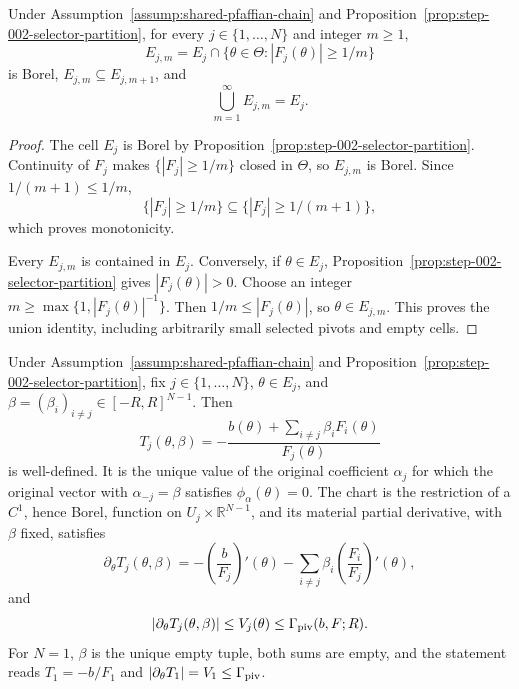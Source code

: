 \begin{lemma}
\label{lem:step-002-chart-exhaustion}
Under Assumption~\ref{assump:shared-pfaffian-chain} and
Proposition~\ref{prop:step-002-selector-partition}, for every
$j\in\{1,\ldots,N\}$ and integer $m\geq1$,
\[
E_{j,m}=E_j\cap\{\theta\in\Theta:|F_j(\theta)|\geq1/m\}
\]
is Borel, $E_{j,m}\subseteq E_{j,m+1}$, and
\[
\bigcup_{m=1}^{\infty}E_{j,m}=E_j.
\]
\end{lemma}

\begin{proof}
The cell $E_j$ is Borel by
Proposition~\ref{prop:step-002-selector-partition}.  Continuity of $F_j$
makes $\{|F_j|\geq1/m\}$ closed in $\Theta$, so $E_{j,m}$ is Borel.  Since
$1/(m+1)\leq1/m$,
\[
\{|F_j|\geq1/m\}\subseteq\{|F_j|\geq1/(m+1)\},
\]
which proves monotonicity.

Every $E_{j,m}$ is contained in $E_j$.  Conversely, if $\theta\in E_j$,
Proposition~\ref{prop:step-002-selector-partition} gives
$|F_j(\theta)|>0$.  Choose an integer
$m\geq\max\{1,|F_j(\theta)|^{-1}\}$.  Then
$1/m\leq|F_j(\theta)|$, so $\theta\in E_{j,m}$.  This proves the union
identity, including arbitrarily small selected pivots and empty cells.
\end{proof}

\begin{proposition}
\label{prop:step-002-exact-chart}
Under Assumption~\ref{assump:shared-pfaffian-chain} and
Proposition~\ref{prop:step-002-selector-partition}, fix
$j\in\{1,\ldots,N\}$, $\theta\in E_j$, and
$\beta=(\beta_i)_{i\neq j}\in[-R,R]^{N-1}$.  Then
\[
T_j(\theta,\beta)
=-\frac{b(\theta)+\sum_{i\neq j}\beta_iF_i(\theta)}{F_j(\theta)}
\]
is well-defined.  It is the unique value of the original coefficient
$\alpha_j$ for which the original vector with $\alpha_{-j}=\beta$ satisfies
$\phi_\alpha(\theta)=0$.  The chart is the restriction of a $C^1$, hence
Borel, function on $U_j\times\mathbb R^{N-1}$, and its material partial
derivative, with $\beta$ fixed, satisfies
\begin{equation}
\partial_\theta T_j(\theta,\beta)
=-\left(\frac b{F_j}\right)'(\theta)
-\sum_{i\neq j}\beta_i
 \left(\frac{F_i}{F_j}\right)'(\theta),
\label{eq:chart-derivative}
\end{equation}
and
\begin{equation}
|\partial_\theta T_j(\theta,\beta)|
\leq V_j(\theta)\leq\Gamma_{\rm piv}(b,F;R).
\label{eq:chart-speed}
\end{equation}
For $N=1$, $\beta$ is the unique empty tuple, both sums are empty, and the
statement reads $T_1=-b/F_1$ and
$|\partial_\theta T_1|=V_1\leq\Gamma_{\rm piv}$.
\end{proposition}


